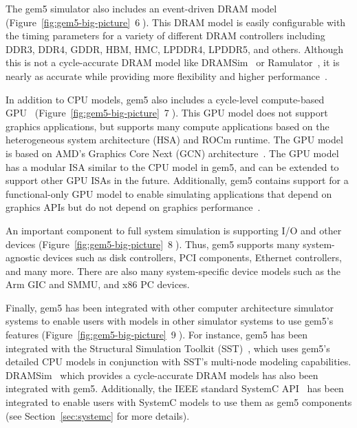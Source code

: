 The gem5 simulator also includes an event-driven DRAM model (Figure~\ref{fig:gem5-big-picture}~\textcircled{6}).
This DRAM model is easily configurable with the timing parameters for a variety of different DRAM controllers including DDR3, DDR4, GDDR, HBM, HMC, LPDDR4, LPDDR5, and others.
Although this is not a cycle-accurate DRAM model like DRAMSim~\cite{wang_05, dramsim2, dramsim3} or Ramulator~\cite{yoongy_16}, it is nearly as accurate while providing more flexibility and higher performance~\cite{HanssonAgarwal2014-gem5DRAM}.

In addition to CPU models, gem5 also includes a cycle-level compute-based GPU~\cite{GutierrezBeckmann2018-amdAPU, Ta2019gputesting} (Figure~\ref{fig:gem5-big-picture}~\textcircled{7}).
This GPU model does not support graphics applications, but supports many compute applications based on the heterogeneous system architecture (HSA) and ROCm runtime.
The GPU model is based on AMD's Graphics Core Next (GCN) architecture~\cite{gcnWhitepaper, gcn3Manual}.
The GPU model has a modular ISA similar to the CPU model in gem5, and can be extended to support other GPU ISAs in the future. Additionally, gem5 contains support for a functional-only GPU model to enable simulating applications that depend on graphics APIs but do not depend on graphics performance~\cite{nomali}.

An important component to full system simulation is supporting I/O and other devices (Figure~\ref{fig:gem5-big-picture}~\textcircled{8}).
Thus, gem5 supports many system-agnostic devices such as disk controllers, PCI components, Ethernet controllers, and many more.
There are also many system-specific device models such as the Arm GIC and SMMU, and x86 PC devices.

Finally, gem5 has been integrated with other computer architecture simulator systems to enable users with models in other simulator systems to use gem5's features (Figure~\ref{fig:gem5-big-picture}~\textcircled{9}).
For instance, gem5 has been integrated with the Structural Simulation Toolkit (SST)~\cite{RodriguesHemmert2011-sst, HsiehPedretti2012-sst-gem5}, which uses gem5's detailed CPU models in conjunction with SST's multi-node modeling capabilities.
DRAMSim~\cite{wang_05, dramsim2, dramsim3} which provides a cycle-accurate DRAM models has also been integrated with gem5.
Additionally, the IEEE standard SystemC API~\cite{menard2017-system-systemc} has been integrated to enable users with SystemC models to use them as gem5 components (see Section~\ref{sec:systemc} for more details).
